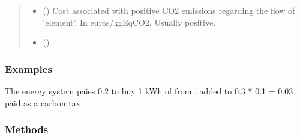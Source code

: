 \documentclass[letterpaper,10pt,english]{sphinxmanual}
\begin{document}
\begin{fulllineitems}
\begin{fulllineitems}
\begin{quote}
\begin{description}
\begin{itemize}
\item {} 
\sphinxAtStartPar
{} (\sphinxstyleliteralemphasis{\sphinxupquote{, }}\sphinxstyleliteralemphasis{\sphinxupquote{, }}) \textendash{} Cost associated with positive CO2 emissions regarding the flow of ‘element’.
In euros/kgEqCO2.
Usually positive.

\item {} 
\sphinxAtStartPar
{} (\sphinxstyleliteralemphasis{\sphinxupquote{, }}) \textendash{} 

\end{itemize}

\end{description}\end{quote}
\subsubsection*{Examples}

\begin{sphinxVerbatim}[commandchars=\\\{\}]
   
   
  
\end{sphinxVerbatim}

\sphinxAtStartPar
The energy system paies 0.2\texteuro{} to buy 1 kWh of  from ,
added to 0.3 * 0.1 = 0.03\texteuro{} paid as a carbon tax.

\end{fulllineitems}

\subsubsection*{Methods}



\end{fulllineitems}
\end{document}
